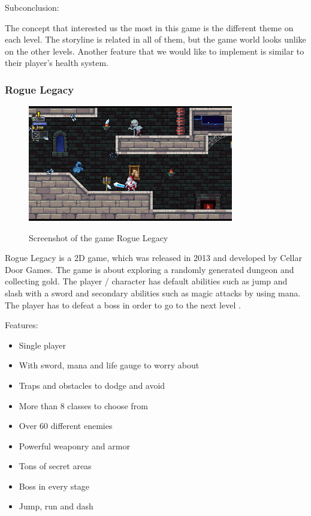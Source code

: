 \documentclass[12p]{article}
\begin{document}
Subconclusion:

The concept that interested us the most in this game is the different theme on each level. The storyline is related in all of them, but the game world looks unlike on the other levels. Another feature that we would like to implement is similar to their player's health system.


\newpage
\subsubsection[Rogue Legacy]{Rogue Legacy \cite{RogueLegacy}}

\begin{figure}[ht]
  \center
  \includegraphics[width=0.8\textwidth]{StateOfTheArtScreenshots/rogue_legacy}
  \label{sec:StateOfTheArt_Screenshots_RogueLegacy}
  \caption{Screenshot of the game Rogue Legacy \cite{RogueLegacyScreenshot}}
\end{figure}

Rogue Legacy is a 2D game, which was released in 2013 and developed by Cellar Door Games. The game is about exploring a randomly generated dungeon and collecting gold. The player  / character has default abilities such as jump and slash with a sword and secondary abilities such as magic attacks by using mana. The player has to defeat a boss in order to go to the next level \cite{RogueLegacyReview}.

Features: \cite{RogueLegacySteam}

\begin{itemize}
  \item Single player
  \item With sword, mana and life gauge to worry about
  \item Traps and obstacles to dodge and avoid
  \item More than 8 classes to choose from
  \item Over 60 different enemies
  \item Powerful weaponry and armor
  \item Tons of secret areas
  \item Boss in every stage
  \item Jump, run and dash
\end{itemize}
\end{document}
